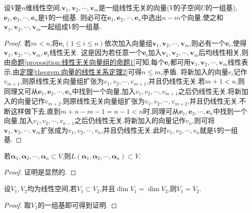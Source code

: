 \documentclass[../../main.tex]{subfiles}
\begin{document}
\begin{theorem}[基扩充定理]\label{theorem:基扩充定理}
设\(V\)是\(n\)维线性空间,\(\boldsymbol{v}_1,\boldsymbol{v}_2,\cdots,\boldsymbol{v}_m\)是一组线性无关的向量(\(V\)的子空间\(U\)的一组基),\(\boldsymbol{e}_1,\boldsymbol{e}_2,\cdots,\boldsymbol{e}_n\)是\(V\)的一组基. 则必可在\(\boldsymbol{e}_1,\boldsymbol{e}_2,\cdots,\boldsymbol{e}_n\)中选出\(n - m\)个向量,使之和\(\boldsymbol{v}_1,\boldsymbol{v}_2,\cdots,\boldsymbol{v}_m\)一起组成\(V\)的一组基.
\end{theorem}
\begin{proof}
若\(m< n\),将\(\boldsymbol{e}_i(1\leq i\leq n)\)依次加入向量组\(\boldsymbol{v}_1,\boldsymbol{v}_2,\cdots,\boldsymbol{v}_m\),则必有一个\(\boldsymbol{e}_i\),使得\(\boldsymbol{v}_1,\boldsymbol{v}_2,\cdots,\boldsymbol{v}_m,\boldsymbol{e}_i\)线性无关. 这是因为若任意一个\(\boldsymbol{e}_i\)加入\(\boldsymbol{v}_1,\boldsymbol{v}_2,\cdots,\boldsymbol{v}_m\)后均线性相关,则由\hyperref[proposition:线性无关向量组的命题1]{命题\ref{proposition:线性无关向量组的命题1}}可知,每个\(\boldsymbol{e}_i\)都可用\(\boldsymbol{v}_1,\boldsymbol{v}_2,\cdots,\boldsymbol{v}_m\)线性表示,由\hyperref[theorem:向量的线性关系定理2]{定理\ref{theorem:向量的线性关系定理2}}可得\(n\leq m\),矛盾. 将新加入的向量$e_i$记作$v_{m+1}$,则原线性无关向量组扩张为$v_1,v_2,\cdots,v_{m+1}$,并且仍线性无关.若\(m + 1< n\),则同理又可从\(\boldsymbol{e}_1,\boldsymbol{e}_2,\cdots,\boldsymbol{e}_n\)中找到一个向量,加入$v_1,v_2,\cdots,v_{m+1}$之后仍线性无关.将新加入的向量记作$v_{m+2}$,则原线性无关向量组扩张为$v_1,v_2,\cdots,v_{m+2}$,并且仍线性无关.不断这样做下去,直到$m+n-m-1=n-1<n$时,同理可从\(\boldsymbol{e}_1,\boldsymbol{e}_2,\cdots,\boldsymbol{e}_n\)中找到一个向量,加入$v_1,v_2,\cdots,v_{n-1}$之后仍线性无关.将新加入的向量记作$v_{n}$,则可将\(\boldsymbol{v}_1,\boldsymbol{v}_2,\cdots,\boldsymbol{v}_m\)扩张成为$v_1,v_2,\cdots,v_{n}$,并且仍线性无关.此时$v_1,v_2,\cdots,v_{n}$就是\(V\)的一组基.
\end{proof}

\begin{proposition}\label{proposition:包含所有向量的空间也包含这些向量张成的空间}
若$\boldsymbol{\alpha }_1,\boldsymbol{\alpha }_2,\cdots ,\boldsymbol{\alpha }_n\subset V$,则$L\left( \boldsymbol{\alpha }_1,\boldsymbol{\alpha }_2,\cdots ,\boldsymbol{\alpha }_n \right) \subset V$.
\end{proposition}
\begin{proof}
证明是显然的.
\end{proof}

\begin{proposition}\label{proposition:与全空间维数相同的子空间等于全空间}
设\(V_1,V_2\)均为线性空间,若\(V_1\subset V_2\),并且\(\dim V_1 = \dim V_2\),则\(V_1 = V_2\).
\end{proposition}
\begin{proof}
取$V_1$的一组基即可得到证明.
\end{proof}
\end{document}
